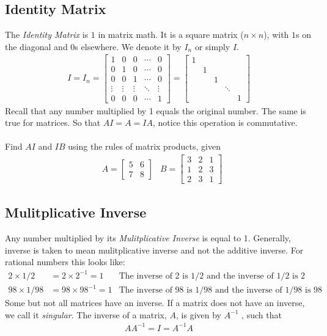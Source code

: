 \documentclass[14pt]{extarticle}
\begin{document}
\subsection{Identity Matrix}
The \textit{Identity Matrix} is $1$ in matrix math. It is a square matrix ($n\times n$), with $1$s on the diagonal and $0$s elsewhere. We denote it by $I_n$ or simply $I$.
\begin{align*}
	I = I_n = \begin{bmatrix}
		1 & 0 & 0 & \cdots & 0 \\
		0 & 1 & 0 & \cdots & 0 \\
		0 & 0 & 1 & \cdots & 0 \\
		\vdots & \vdots & \vdots & \ddots & \vdots \\
		0 & 0 & 0 &\cdots & 1
	\end{bmatrix} = 
	\begin{bmatrix}
		1 &  &  &  & \\
		 & 1 &  &  &  \\
		 &  & 1 &  &  \\
		 &  &  & \ddots &  \\
		 &  &  & & 1
	\end{bmatrix}	
\end{align*}
Recall that any number multiplied by 1 equals the original number. The same is true for matrices. So that $AI=A = IA$, notice this operation is commutative.
\\\\
Find $AI$ and $IB$ using the rules of matrix products, given
\begin{align*}
	&A = \begin{bmatrix}
		5 & 6 \\
		7 & 8
	\end{bmatrix}
	&B = \begin{bmatrix}
		3 & 2 & 1 \\
		1 & 2 & 3 \\
		2 & 3 & 1
	\end{bmatrix}
\end{align*}

\subsection{Mulitplicative Inverse}
Any number multiplied by its \textit{Mulitplicative Inverse} is equal to 1. Generally, inverse is taken to mean mulitplicative inverse and not the additive inverse. For rational numbers this looks like:
\begin{align*}
	2 \times 1/2 &= 2 \times 2^{-1} = 1 &\text{The inverse of $2$ is $1/2$ and the inverse of $1/2$ is $2$} \\
	98 \times 1/98 &= 98 \times 98^{-1} =1 &\text{The inverse of $98$ is $1/98$ and the inverse of $1/98$ is $98$}
\end{align*}
Some but not all matrices have an inverse. If a matrix does not have an inverse, we call it \textit{singular}. The inverse of a matrix, $A$, is given by $A^{-1}$ , such that
\begin{align*}
	AA^{-1} = I = A^{-1}A
\end{align*}
\end{document}
